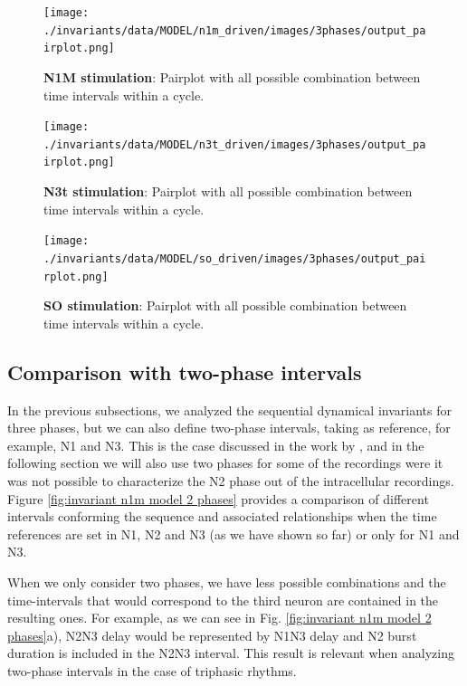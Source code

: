 \begin{figure}[htbp]
	\centering
	\texttt{[image: ./invariants/data/MODEL/n1m\_driven/images/3phases/output\_pairplot.png]}
	\caption{\textbf{N1M stimulation}: Pairplot with all possible combination between time intervals within a cycle.}
	\label{fig:model n1m stimulation pairplot}
\end{figure}
 
\begin{figure}[htbp]
	\centering
	\texttt{[image: ./invariants/data/MODEL/n3t\_driven/images/3phases/output\_pairplot.png]}
	\caption{\textbf{N3t stimulation}: Pairplot with all possible combination between time intervals within a cycle.}
	\label{fig:model n3t stimulation pairplot}
\end{figure}

\begin{figure}[htbp]
	\centering
	\texttt{[image: ./invariants/data/MODEL/so\_driven/images/3phases/output\_pairplot.png]}
	\caption{\textbf{SO stimulation}: Pairplot with all possible combination between time intervals within a cycle.}
	\label{fig:model so stimulation pairplot}
\end{figure}

%
\subsection{Comparison with two-phase intervals}
In the previous subsections, we analyzed the sequential dynamical invariants for three phases, but we can also define two-phase intervals, taking as reference, for example, N1 and N3. This is the case discussed in the work by \textcite{elices_robust_2019}, and in the following section we will also use two phases for some of the recordings were it was not possible to characterize the N2 phase out of the intracellular recordings. Figure \ref{fig:invariant n1m model 2 phases} provides a comparison of  different intervals conforming the sequence and associated relationships when the time references are set in N1, N2 and N3 (as we have shown so far) or only for N1 and N3.

When we only consider two phases, we have less possible combinations and the time-intervals that would correspond to the third neuron are contained in the resulting ones. For example, as we can see in Fig. \ref{fig:invariant n1m model 2 phases}a), N2N3 delay would be represented by N1N3 delay and N2 burst duration is included in the N2N3 interval. This result is relevant when analyzing two-phase intervals in the case of triphasic rhythms.

